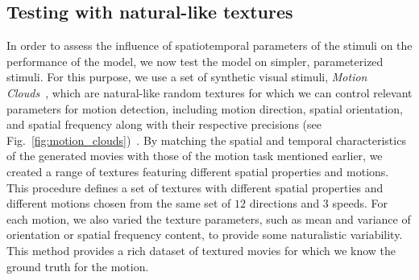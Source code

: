 \documentclass[default]{sn-jnl}%
\theoremstyle{thmstyleone}%
\theoremstyle{thmstyletwo}%
\theoremstyle{thmstylethree}%
\newcommand{\seeFig}[1]{see Fig.~\ref{fig:#1}}%
\begin{document}
\subsection{Testing with natural-like textures}
In order to assess the influence of spatiotemporal parameters of the stimuli on the performance of the model, we now test the model on simpler, parameterized stimuli. For this purpose, we use a set of synthetic visual stimuli, \textit{Motion Clouds}~\citep{leon_motion_2012}, which are natural-like random textures for which we can control relevant parameters for motion detection, including motion direction, spatial orientation, and spatial frequency along with their respective precisions (\seeFig{motion_clouds})~\citep{vacher_bayesian_2018}. By matching the spatial and temporal characteristics of the generated movies with those of the motion task mentioned earlier, we created a range of textures featuring different spatial properties and motions. This procedure defines a set of textures with different spatial properties and different motions chosen from the same set of $12$ directions and $3$ speeds. For each motion, we also varied the texture parameters, such as mean and variance of orientation or spatial frequency content, to provide some naturalistic variability. This method provides a rich dataset of textured movies for which we know the ground truth for the motion.
\end{document}
